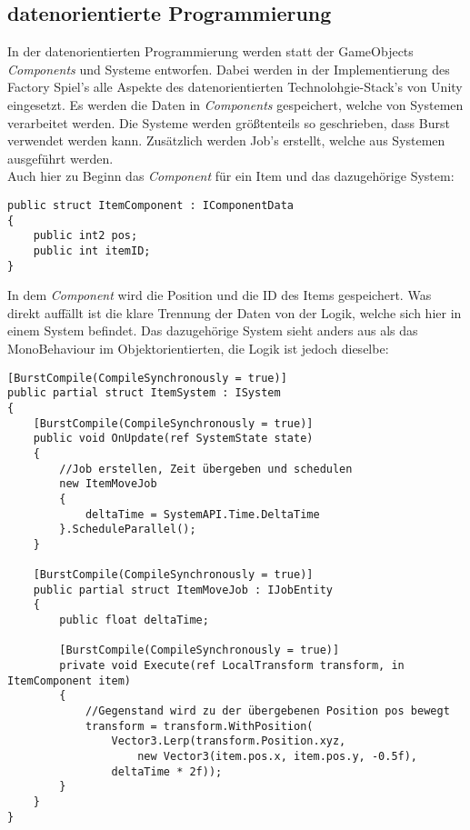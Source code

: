 \subsection{datenorientierte Programmierung}
In der datenorientierten Programmierung werden statt der GameObjects \textit{Components} und Systeme entworfen. Dabei werden in der Implementierung des Factory Spiel's alle Aspekte des datenorientierten Technolohgie-Stack's von Unity eingesetzt. Es werden die Daten in \textit{Components} gespeichert, welche von Systemen verarbeitet werden. Die Systeme werden größtenteils so geschrieben, dass Burst verwendet werden kann. Zusätzlich werden Job's erstellt, welche aus Systemen ausgeführt werden.\\
Auch hier zu Beginn das \textit{Component} für ein Item und das dazugehörige System:
\begin{lstlisting}[style=code, caption={Item Component ECS}, label=itemComponent]
public struct ItemComponent : IComponentData
{
    public int2 pos;
    public int itemID;
}
\end{lstlisting}
In dem \textit{Component} wird die Position und die ID des Items gespeichert. Was direkt auffällt ist die klare Trennung der Daten von der Logik, welche sich hier in einem System befindet. Das dazugehörige System sieht anders aus als das MonoBehaviour im Objektorientierten, die Logik ist jedoch dieselbe:
\begin{lstlisting}[style=code, caption={Item System und Job zum Bewegen von Items}]
[BurstCompile(CompileSynchronously = true)]
public partial struct ItemSystem : ISystem
{
    [BurstCompile(CompileSynchronously = true)]
    public void OnUpdate(ref SystemState state)
    {
    	//Job erstellen, Zeit übergeben und schedulen
        new ItemMoveJob
        {
            deltaTime = SystemAPI.Time.DeltaTime
        }.ScheduleParallel();
    }

    [BurstCompile(CompileSynchronously = true)]
    public partial struct ItemMoveJob : IJobEntity
    {
        public float deltaTime;
        
        [BurstCompile(CompileSynchronously = true)]
        private void Execute(ref LocalTransform transform, in ItemComponent item)
        {
        	//Gegenstand wird zu der übergebenen Position pos bewegt
            transform = transform.WithPosition(
                Vector3.Lerp(transform.Position.xyz,
                    new Vector3(item.pos.x, item.pos.y, -0.5f),
                deltaTime * 2f));
        }
    }
}
\end{lstlisting}
